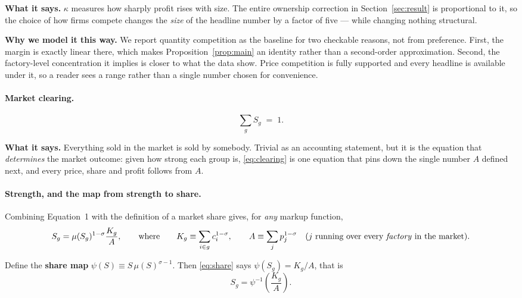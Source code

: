 \documentclass[11pt]{article}
\newcommand{\says}[1]{\smallskip\noindent\textbf{What it says.} #1\smallskip}
\newcommand{\why}[1]{\smallskip\noindent\textbf{Why we model it this way.} #1\smallskip}
\theoremstyle{plain}
\theoremstyle{remark}
\theoremstyle{definition}
\begin{document}
\says{$\kappa$ measures how sharply profit rises with size. The entire ownership
correction in Section~\ref{sec:result} is proportional to it, so the choice of how firms compete
changes the \emph{size} of the headline number by a factor of five --- while changing
nothing structural.}

\why{We report quantity competition as the baseline for two checkable reasons, not
from preference. First, the margin is exactly linear there, which makes
Proposition~\ref{prop:main} an identity rather than a second-order approximation.
Second, the factory-level concentration it implies is closer to what the data show.
Price competition is fully supported and every headline is available under it, so a
reader sees a range rather than a single number chosen for convenience.}

\paragraph{Market clearing.}

\begin{equation}
  \sum_g S_g \;=\; 1 .
  \label{eq:clearing}
\end{equation}

\says{Everything sold in the market is sold by somebody. Trivial as an accounting
statement, but it is the equation that \emph{determines} the market outcome: given how
strong each group is, \eqref{eq:clearing} is one equation that pins down the single
number $A$ defined next, and every price, share and profit follows from $A$.}

\paragraph{Strength, and the map from strength to share.}

Combining Equation~1 with the definition of a market share gives, for \emph{any}
markup function,
\begin{equation}
  S_g=\mu(S_g)^{1-\sigma}\frac{K_g}{A},
  \qquad\text{where}\qquad
  K_g\equiv\sum_{i\in g}c_i^{1-\sigma},
  \qquad
  A\equiv\sum_j p_j^{1-\sigma}
  \quad\text{($j$ running over every \emph{factory} in the market).}
  \label{eq:share}
\end{equation}

Define the \textbf{share map} $\psi(S)\equiv S\,\mu(S)^{\sigma-1}$. Then
\eqref{eq:share} says $\psi(S_g)=K_g/A$, that is
\begin{equation}
  \boxed{\;S_g=\psi^{-1}\!\left(\frac{K_g}{A}\right).\;}
  \label{eq:psiinv}
\end{equation}
\end{document}
